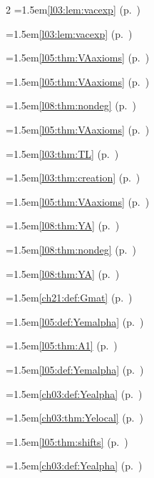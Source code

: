 \begin{multicols}{2}
\hangindent=1.5em\quad \ref{l03:lem:vacexp} (p.~\pageref{l03:lem:vacexp})\par
\hangindent=1.5em\quad \ref{l03:lem:vacexp} (p.~\pageref{l03:lem:vacexp})\par
\hangindent=1.5em\quad \ref{l05:thm:VAaxioms} (p.~\pageref{l05:thm:VAaxioms})\par
\hangindent=1.5em\quad \ref{l05:thm:VAaxioms} (p.~\pageref{l05:thm:VAaxioms})\par
\hangindent=1.5em\quad \ref{l08:thm:nondeg} (p.~\pageref{l08:thm:nondeg})\par
\hangindent=1.5em\quad \ref{l05:thm:VAaxioms} (p.~\pageref{l05:thm:VAaxioms})\par
\hangindent=1.5em\quad \ref{l03:thm:TL} (p.~\pageref{l03:thm:TL})\par
\hangindent=1.5em\quad \ref{l03:thm:creation} (p.~\pageref{l03:thm:creation})\par
\hangindent=1.5em\quad \ref{l05:thm:VAaxioms} (p.~\pageref{l05:thm:VAaxioms})\par
\hangindent=1.5em\quad \ref{l08:thm:YA} (p.~\pageref{l08:thm:YA})\par
\hangindent=1.5em\quad \ref{l08:thm:nondeg} (p.~\pageref{l08:thm:nondeg})\par
\hangindent=1.5em\quad \ref{l08:thm:YA} (p.~\pageref{l08:thm:YA})\par
\hangindent=1.5em\quad \ref{ch21:def:Gmat} (p.~\pageref{ch21:def:Gmat})\par
\hangindent=1.5em\quad \ref{l05:def:Yemalpha} (p.~\pageref{l05:def:Yemalpha})\par
\hangindent=1.5em\quad \ref{l05:thm:A1} (p.~\pageref{l05:thm:A1})\par
\hangindent=1.5em\quad \ref{l05:def:Yemalpha} (p.~\pageref{l05:def:Yemalpha})\par
\hangindent=1.5em\quad \ref{ch03:def:Yealpha} (p.~\pageref{ch03:def:Yealpha})\par
\hangindent=1.5em\quad \ref{ch03:thm:Yelocal} (p.~\pageref{ch03:thm:Yelocal})\par
\hangindent=1.5em\quad \ref{l05:thm:shifts} (p.~\pageref{l05:thm:shifts})\par
\hangindent=1.5em\quad \ref{ch03:def:Yealpha} (p.~\pageref{ch03:def:Yealpha})\par

\end{multicols}
